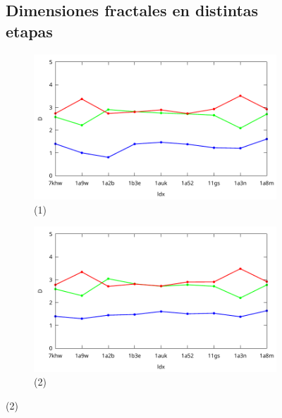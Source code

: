 	\begin{figure}[H]
		\subsection*{Dimensiones fractales en distintas etapas}	
		\centering
		\begin{subfigure}{0.49\textwidth}
			\centering
			\includegraphics[width=\linewidth,page=1]{graphs/PDBs/Dvsldx/DvsaddH.pdf}
			\caption{(1)}
		\end{subfigure}
		\hfill
		\begin{subfigure}{0.49\textwidth}
			\centering
			\includegraphics[width=\linewidth,page=1]{graphs/PDBs/Dvsldx/DvsEm.pdf}
			\caption{(2)}
		\end{subfigure}
		
		\vspace{0.3cm}
		

\end{figure}
